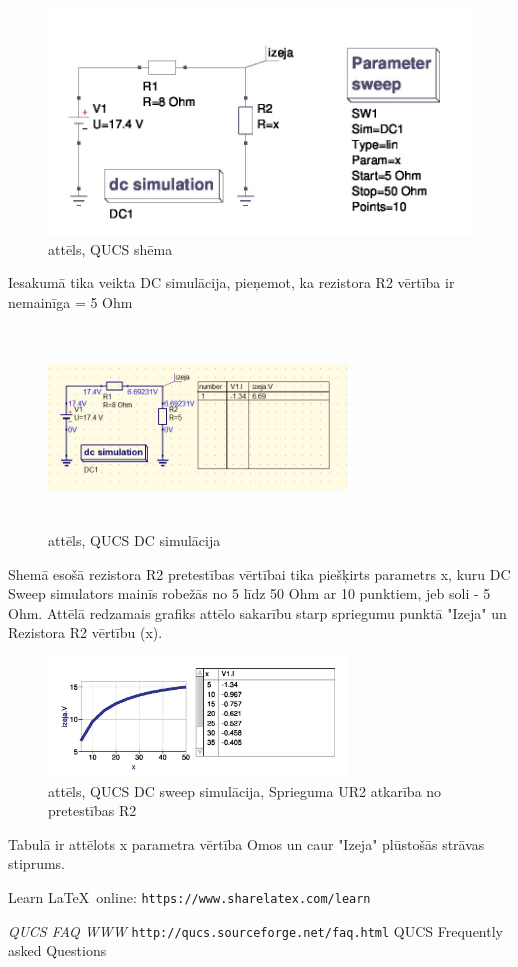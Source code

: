 \documentclass[a4paper,10pt]{report}
\begin{document}
\begin{figure}[H]
\includegraphics{qucsShema.jpg}
\caption{attēls, QUCS shēma}
\end{figure}
Iesakumā tika veikta DC simulācija, pieņemot, ka rezistora R2 vērtība ir nemainīga = 5 Ohm
\begin{figure}[H]
\includegraphics[width=300px,height=200px,keepaspectratio]{qucsDCsim.jpg}
\caption{attēls, QUCS DC simulācija}
\end{figure}
Shemā esošā rezistora R2 pretestības vērtībai tika piešķirts parametrs x, kuru DC Sweep simulators mainīs robežās no 5 līdz 50 Ohm ar 10 punktiem, jeb soli - 5 Ohm.
Attēlā redzamais grafiks attēlo sakarību starp spriegumu punktā "Izeja" un Rezistora R2 vērtību (x).

\begin{figure}[H]
\includegraphics[width=300px,height=120px,keepaspectratio]{qucsSimulacija.jpg}
\caption{attēls, QUCS DC sweep simulācija, Sprieguma UR2 atkarība no pretestības R2}
\end{figure}
Tabulā ir attēlots x parametra vērtība Omos un caur "Izeja" plūstošās strāvas stiprums.

\begin{thebibliography}{2}
Learn \LaTeX\ online:
\texttt{https://www.sharelatex.com/learn}

\textit{QUCS FAQ WWW}
\texttt{http://qucs.sourceforge.net/faq.html} 
QUCS Frequently asked Questions
\end{thebibliography}
\end{document}
